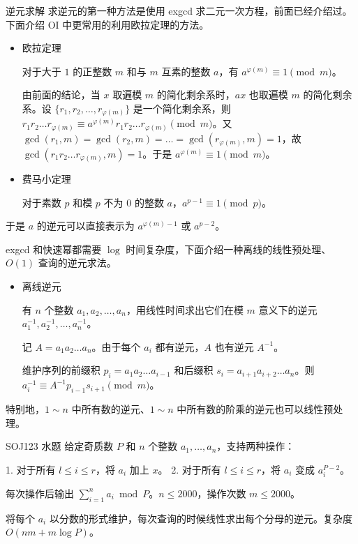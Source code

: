 \documentclass [hyperref={bookmarksdepth=4}, aspectratio=169] {beamer}
\theoremstyle {fy}
\begin{document}
\begin{frame}{逆元求解}
求逆元的第一种方法是使用 exgcd 求二元一次方程，前面已经介绍过。下面介绍 OI 中更常用的利用欧拉定理的方法。

\begin{itemize}
    \item 欧拉定理

  对于大于 $1$ 的正整数 $m$ 和与 $m$ 互素的整数 $a$，有 $a^{\varphi(m)}\equiv 1\pmod m$。

  由前面的结论，当 $x$ 取遍模 $m$ 的简化剩余系时，$ax$ 也取遍模 $m$ 的简化剩余系。设 $\{r_1,r_2,\dots,r_{\varphi(m)}\}$ 是一个简化剩余系，则 $r_1r_2\dots r_{\varphi(m)}\equiv a^{\varphi(m)}r_1r_2\dots r_{\varphi(m)}\pmod m$。又 $\gcd(r_1,m)=\gcd(r_2,m)=\dots=\gcd(r_{\varphi(m)},m)=1$，故 $\gcd(r_1r_2\dots r_{\varphi(m)},m)=1$。于是 $a^{\varphi(m)}\equiv 1\pmod m$。

    \item 费马小定理

  对于素数 $p$ 和模 $p$ 不为 $0$ 的整数 $a$，$a^{p-1}\equiv 1\pmod p$。
\end{itemize}

于是 $a$ 的逆元可以直接表示为 $a^{\varphi(m)-1}$ 或 $a^{p-2}$。

exgcd 和快速幂都需要 $\log$ 时间复杂度，下面介绍一种离线的线性预处理、$O(1)$ 查询的逆元求法。

\begin{itemize}
    \item 离线逆元

  有 $n$ 个整数 $a_1,a_2,\dots,a_n$，用线性时间求出它们在模 $m$ 意义下的逆元 $a_1^{-1},a_2^{-1},\dots,a_n^{-1}$。

  记 $A=a_1a_2\dots a_n$。由于每个 $a_i$ 都有逆元，$A$ 也有逆元 $A^{-1}$。

  维护序列的前缀积 $p_i=a_1a_2\dots a_{i-1}$ 和后缀积 $s_i=a_{i+1}a_{i+2}\dots a_n$。则 $a_i^{-1}\equiv A^{-1}p_{i-1}s_{i+1}\pmod m$。
\end{itemize}

特别地，$1\sim n$ 中所有数的逆元、$1\sim n$ 中所有数的阶乘的逆元也可以线性预处理。
\end{frame}

\begin{frame}{SOJ123 水题}
给定奇质数 $P$ 和 $n$ 个整数 $a_1,\dots,a_n$，支持两种操作：

1. 对于所有 $l\le i\le r$，将 $a_i$ 加上 $x$。
2. 对于所有 $l\le i\le r$，将 $a_i$ 变成 $a_i^{P-2}$。

每次操作后输出 $\sum\limits_{i=1}^na_i\bmod P$。$n\le 2000$，操作次数 $m\le 2000$。

将每个 $a_i$ 以分数的形式维护，每次查询的时候线性求出每个分母的逆元。复杂度 $O(nm+m\log P)$。
\end{frame}
\end{document}
